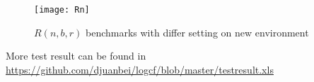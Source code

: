 %





\begin{figure}[!ht]
\begin{centering}
\texttt{[image: Rn]}
\caption{ $R(n,b,r)$ benchmarks  with differ setting on new environment\label{fig:2}}
\end{centering}
\end{figure}

{\color{red} More test result can be found in \url{https://github.com/djuanbei/logcf/blob/master/testresult.xls}}